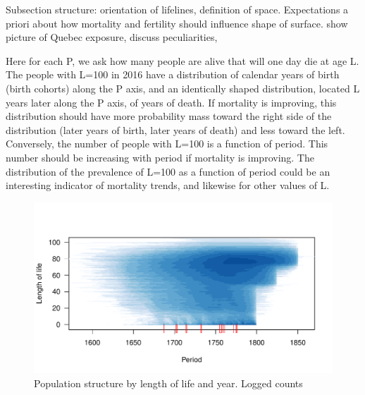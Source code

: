 Subsection structure: orientation of lifelines, definition of space.
Expectations a priori about how mortality and fertility should influence shape
of surface. show picture of Quebec exposure, discuss peculiarities,

\begin{small}
Here for each P, we ask how many people are alive that will one day die at age
L. The people with L=100 in 2016 have a distribution of calendar years
of birth (birth cohorts) along the P axis, and an identically shaped
distribution, located L years later along the P axis, of years of
death. If mortality is improving, this distribution should have more
probability mass toward the right side of the distribution (later
years of birth, later years of death) and less toward the left.
Conversely, the number of people with L=100 is a function of period.
This number should be increasing with period if mortality is
improving. The distribution of the prevalence of L=100 as a function
of period could be an interesting indicator of mortality trends, and
likewise for other values of L.
\end{small}

\begin{figure}
\centering
\includegraphics[scale=.9]{Figures/QuebecLP.pdf}
\caption{Population structure by length of life and year. Logged counts}
\label{fig:lpq}
\end{figure}

